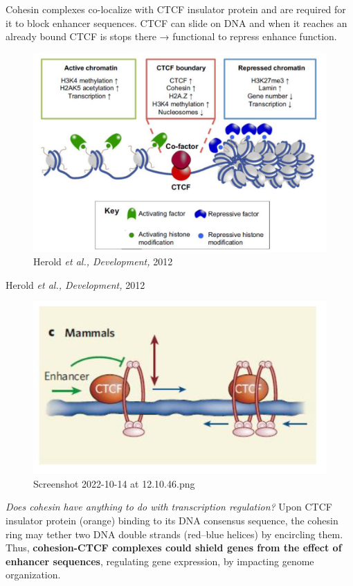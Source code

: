Cohesin complexes co-localize with CTCF insulator protein and are required for it to block enhancer sequences. CTCF can slide on DNA and when it reaches an already bound CTCF is stops there → functional to repress enhance function.

\begin{figure}
\centering
\includegraphics[width=\textwidth]{../_resources/Screenshot_2022-10-14_at_12-11-11.png}
\caption{Herold \emph{et al., Development,} 2012}
\end{figure}

Herold \emph{et al., Development,} 2012

\begin{figure}
\centering
\includegraphics[width=\textwidth]{../_resources/Screenshot_2022-10-14_at_12-10-46.png}
\caption{Screenshot 2022-10-14 at 12.10.46.png}
\end{figure}

\emph{Does cohesin have anything to do with transcription regulation?}
Upon CTCF insulator protein (orange) binding to its DNA consensus sequence, the cohesin ring may tether two DNA double strands (red--blue helices) by encircling them. Thus, \textbf{cohesion-CTCF complexes could shield genes from the effect of enhancer sequences}, regulating gene expression, by impacting genome organization.


